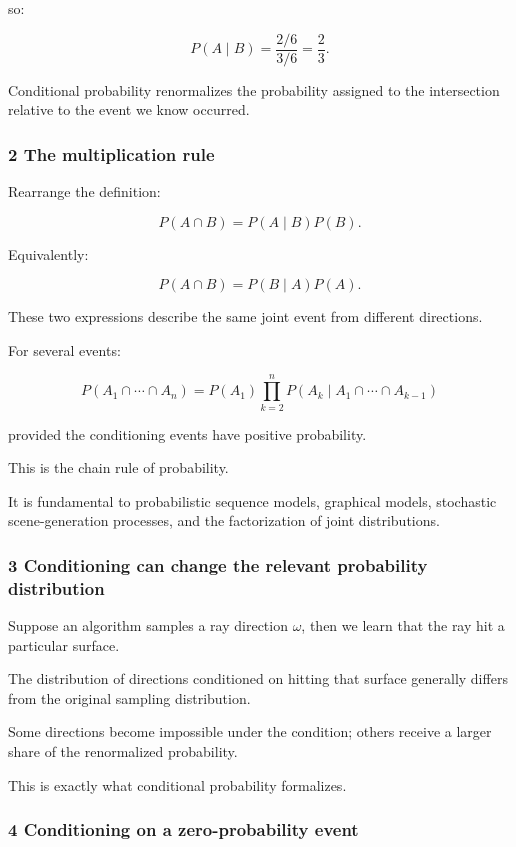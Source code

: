 so:

\[
 P(A\mid B) = \frac{2/6}{3/6} =\boxed{\frac23}.
\]

Conditional probability renormalizes the probability assigned to the intersection relative to the event we know occurred.

\subsubsection{2 The multiplication rule}\label{02-foundations-ii-ch023-the-multiplication-rule}

Rearrange the definition:

\[
 P(A\cap B) = P(A\mid B)P(B).
\]

Equivalently:

\[
 \boxed{ P(A\cap B) = P(B\mid A)P(A) }.
\]

These two expressions describe the same joint event from different directions.

For several events:

\[
 \boxed{ P(A_1\cap\cdots\cap A_n) = P(A_1) \prod_{k=2}^{n} P(A_k\mid A_1\cap\cdots\cap A_{k-1}) }
\]

provided the conditioning events have positive probability.

This is the chain rule of probability.

It is fundamental to probabilistic sequence models, graphical models, stochastic scene-generation processes, and the factorization of joint distributions.

\subsubsection{3 Conditioning can change the relevant probability distribution}\label{02-foundations-ii-ch023-conditioning-can-change-the-relevant-probability-distribution}

Suppose an algorithm samples a ray direction \(\omega\), then we learn that the ray hit a particular surface.

The distribution of directions conditioned on hitting that surface generally differs from the original sampling distribution.

Some directions become impossible under the condition; others receive a larger share of the renormalized probability.

This is exactly what conditional probability formalizes.

\subsubsection{4 Conditioning on a zero-probability event}\label{02-foundations-ii-ch023-conditioning-on-a-zero-probability-event}

